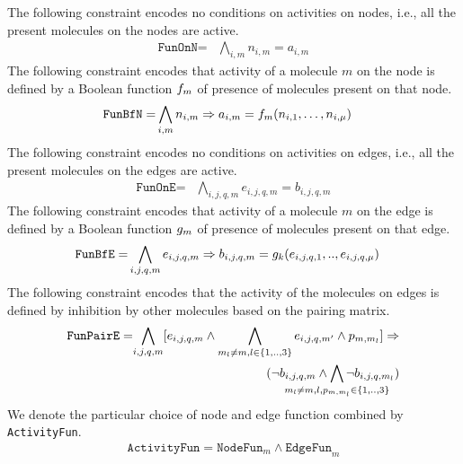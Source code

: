 The following constraint encodes no conditions on activities on nodes,
i.e., all the present molecules on the nodes are active.
\begin{align*}
\texttt{FunOnN} =& \bigwedge\limits_{i,m} n_{i,m} = a_{i,m}  
\end{align*}
The following constraint encodes that activity of a molecule $m$ on the node is
defined by a Boolean function $f_m$ of presence of molecules present on that node.
\begin{align*}
\texttt{FunBfN} =& \bigwedge\limits_{i,m} n_{i,m} \Rightarrow a_{i,m} =  f_m (n_{i,1},\dots,n_{i,\mu}) 
\end{align*}
The following constraint encodes no conditions on activities on edges,
i.e., all the present molecules on the edges are active.
\begin{align*}
 \texttt{FunOnE} =& \bigwedge\limits_{i,j,q,m} e_{i,j,q,m} = b_{i,j,q,m}
\end{align*}
The following constraint encodes that activity of a molecule $m$ on the edge is
defined by a Boolean function $g_m$ of presence of molecules present on that edge.
\begin{align*}
 \texttt{FunBfE} =& \bigwedge\limits_{i,j,q,m} e_{i,j,q,m} \Rightarrow b_{i,j,q,m} = g_k(e_{i,j,q,1}, .., e_{i,j,q,\mu} )
\end{align*}
%
The following constraint encodes that the activity of the molecules on
edges is defined by inhibition by other molecules based on the pairing
matrix. 
\begin{align*}
\texttt{FunPairE} =&	\begin{aligned}[t]
\bigwedge\limits_{i,j,q, m}  [e_{i,j,q,m} \land \bigwedge_{m_l \neq m,l \in \{1,..,3\}} e_{i,j,q,m'} \land p_{m, m_l}] \limplies\\
	(\neg b_{i,j,q,m} \land \bigwedge_{\mathclap{m_l \neq m,l, p_{m, m_l} \in \{1,..,3\}}} \neg b_{i,j,q,m_l})\end{aligned}\\
\end{align*}
%
We denote the particular choice of node and edge function combined by \texttt{ActivityFun}.
\begin{align*}
\texttt{ActivityFun} = \texttt{NodeFun}_m \land \texttt{EdgeFun}_m
\end{align*}

